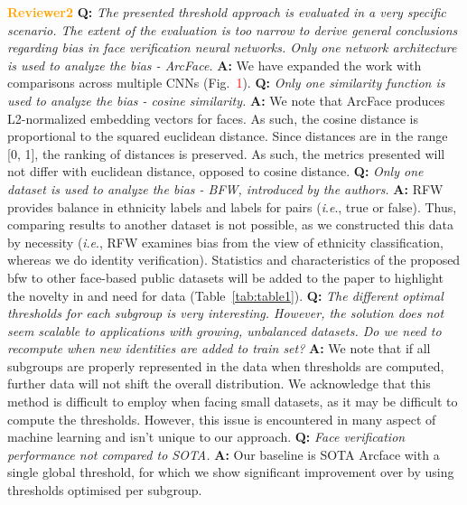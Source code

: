 \documentclass[10pt,twocolumn,letterpaper]{article}
\newcommand{\ie}{\textit{i}.\textit{e}., }
\begin{document}
\noindent\textbf{\textcolor{orange}{Reviewer2}}
\textbf{Q:} \textit{The presented threshold approach is evaluated in a very specific scenario. The extent of the evaluation is too narrow to derive general conclusions regarding bias in face verification neural networks. Only one network architecture is used to analyze the bias - ArcFace.} 
\textbf{A:} We have expanded the work with comparisons across multiple CNNs (Fig.~\textcolor{red}{1}). 
\textbf{Q:} \textit{ Only one similarity function is used to analyze the bias - cosine similarity.}  
\textbf{A:} We note that ArcFace produces L2-normalized embedding vectors for faces. As such, the cosine distance is proportional to the squared euclidean distance. Since distances are in the range [0, 1], the ranking of distances is preserved. As such, the metrics presented will not differ with euclidean distance, opposed to cosine distance. 
\textbf{Q:} \textit{Only one dataset is used to analyze the bias - BFW, introduced by the authors.} 
\textbf{A:} RFW provides balance in ethnicity labels and labels for pairs (\ie true or false). Thus, comparing results to another dataset is not possible, as we constructed this data by necessity (\ie RFW examines bias from the view of ethnicity classification, whereas we do identity verification).
Statistics and characteristics of the proposed \gls{bfw} to other face-based public datasets will be added to the paper to highlight the novelty in and need for data (Table~\ref{tab:table1}). 
\textbf{Q:} \textit{The different optimal thresholds for each subgroup is very interesting. However, the solution does not seem scalable to applications with growing, unbalanced datasets. Do we need to recompute when new identities are added to train set?} \textbf{A:} We note that if all subgroups are properly represented in the data when thresholds are computed, further data will not shift the overall distribution. We acknowledge that this method is difficult to employ when facing small datasets, as it may be difficult to compute the thresholds. However, this issue is encountered in many aspect of machine learning and isn't unique to our approach.
\textbf{Q:} \textit{Face verification performance not compared to SOTA.} 
\textbf{A:} Our baseline is SOTA Arcface with a single global threshold, for which we show significant improvement over by using thresholds optimised per subgroup.
\end{document}
